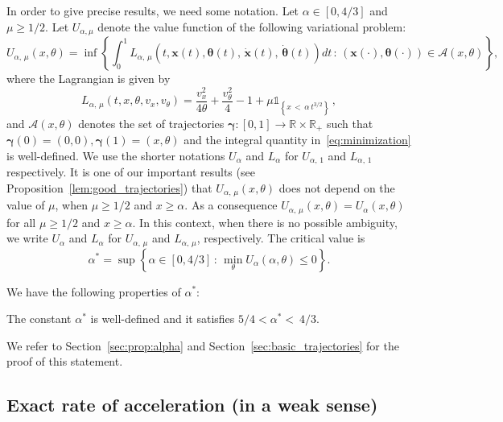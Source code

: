 \documentclass[AHL,Unicode,longabstracts]{cedram}
\newcommand{\R}{\mathbb{R}}
\newcommand{\bx}{\mathbf{x}}
\newcommand{\mA}{\mathcal{A}}
\newcommand{\bgamma}{\boldsymbol \gamma}
\newcommand{\btheta}{\boldsymbol{\theta}}
\newcommand{\1}{\mathds{1}}
\begin{document}
In order to give precise results, we need some notation. Let $\alpha\in[0,4/3]$ and $\mu \geq 1/2$. Let $U_{\alpha,\mu}$ denote the value function of the following variational problem:
\begin{equation}\label{eq:minimization}
U_{\alpha,\,\mu}(x,\theta) = \inf \left\{ \int_0^1 L_{\alpha,\,\mu}\left(t,\bx(t),\btheta(t),\,\dot{\bx}(t),\,\dot{\btheta}(t)\right)dt\,:\,\left(\bx(\cdot),\btheta(\cdot)\right) \in \mA(x,\theta)\right\},
\end{equation}
where the Lagrangian is given by
\begin{equation}\label{eq:lagrangian16}
L_{\alpha,\,\mu}\left(t,x,\theta,v_x,v_\theta\right) = \frac{v_x^2}{4 \theta} + \frac{v_\theta^2}{4} - 1 + \mu \1_{\left\{ x\,<\,\alpha\,t^{3/2}\right\}}\,,
\end{equation}
and $\mA(x,\theta)$ denotes the set of trajectories $\bgamma: [0,1] \to \R\times \R_+$ such that $\bgamma(0) = (0,0), \bgamma(1) = (x,\theta)$ and the integral quantity in~\eqref{eq:minimization} is well-defined. We use the shorter notations $U_\alpha$ and $L_\alpha$ for $U_{\alpha,\,1}$ and $L_{\alpha,\,1}$ respectively. It is one of our important results (see Proposition~\ref{lem:good_trajectories}) that $U_{\alpha,\,\mu}(x, \theta)$ does not depend on the value of $\mu$, when $\mu\geq 1/2$ and $x\geq \alpha$. As a consequence $U_{\alpha,\,\mu}(x, \theta)=U_{\alpha}(x, \theta)$ for all $\mu\geq 1/2$ and $x\geq \alpha$. In this context, when there is no possible ambiguity, we write $U_\alpha$ and $L_\alpha$ for $U_{\alpha,\,\mu}$ and $L_{\alpha,\,\mu}$, respectively. The critical value is
\begin{equation}\label{eq:alpha^*}
\alpha^* = \sup\left\{ \alpha \in [0,4/3]\,:\,\min_\theta U_\alpha(\alpha, \theta) \leq 0\right\}.
\end{equation}

We have the following properties of $\alpha^*$:
\begin{proposition}\label{prop:alpha}
The constant $\alpha^*$ is well-defined and it satisfies $5/4 < \alpha^*<~4/3$.
\end{proposition}

We refer to Section~\ref{sec:prop:alpha} and Section~\ref{sec:basic_trajectories} for the proof of this statement.

\subsection*{Exact rate of acceleration (in a weak sense)}
\end{document}
